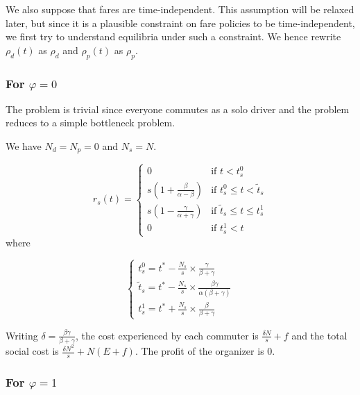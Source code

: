 \documentclass[english, a4paper]{article}
\theoremstyle{plain}
\theoremstyle{definition}
\theoremstyle{remark}
\begin{document}
We also suppose that fares are time-independent. This assumption will be relaxed later, but since it is a plausible constraint on fare policies to be time-independent, we first try to understand equilibria under such a constraint. We hence rewrite $\rho _d(t)$ as $\rho _d$ and $\rho _p(t)$ as $\rho _p$.

\subsubsection{For $\varphi = 0$}

The problem is trivial since everyone commutes as a solo driver and the problem reduces to a simple bottleneck problem.

We have $N_d = N_p = 0$ and $N_s = N$.

\begin{equation}
\label{eq_rs}
r_s(t) = \left\{
\begin{array}{lr}
    0 & \text{if } t<t_s^0\\
    s\left( 1 + \frac{\beta}{\alpha - \beta} \right) & \text{if } t_s^0 \leq t < \tilde{t}_s\\
    s\left( 1 - \frac{\gamma}{\alpha + \gamma} \right) & \text{if } \tilde{t}_s \leq t \leq t_s^1\\
    0 & \text{if } t_s^1 < t
\end{array}
\right.
\end{equation}
where

\begin{equation}
\label{eq_ts}
\left\{
\begin{array}{l}
    t_s^0 = t^* - \frac{N_s}{s} \times \frac{\gamma}{\beta + \gamma}\\
    \tilde{t}_s = t^* - \frac{N_s}{s} \times \frac{\beta \gamma}{\alpha(\beta + \gamma)}\\
    t_s^1 = t^* + \frac{N_s}{s} \times \frac{\beta}{\beta + \gamma}
\end{array}
\right.
\end{equation}

Writing $\delta = \frac{\beta \gamma}{\beta + \gamma}$, the cost experienced by each commuter is $\frac{\delta N}{s} + f$ and the total social cost is $\frac{\delta N^2}{s} + N(E + f)$. The profit of the organizer is $0$.

\subsubsection{For $\varphi = 1$}
\end{document}
